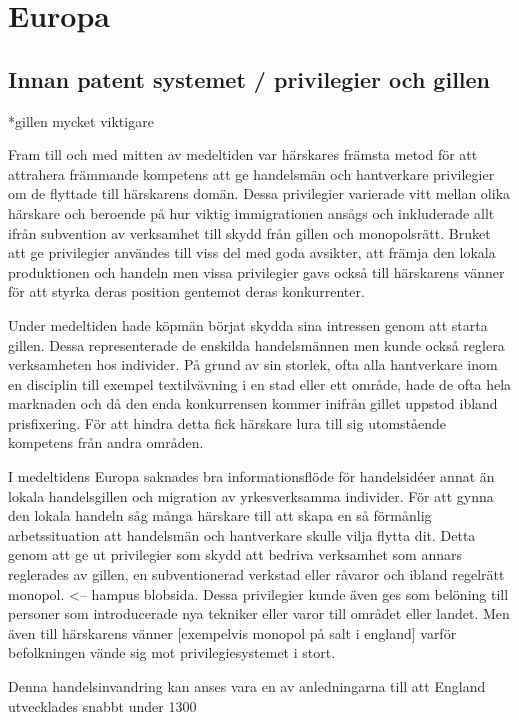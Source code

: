\section{Europa}

\subsection{Innan patent systemet / privilegier och gillen} %
\label{sub:innan_patent_systemet}
*gillen mycket viktigare

Fram till och med mitten av medeltiden var härskares främsta metod för att attrahera främmande kompetens att ge handelsmän och hantverkare privilegier om de flyttade till härskarens domän. 
Dessa privilegier varierade vitt mellan olika härskare och beroende på hur viktig immigrationen ansågs och inkluderade allt ifrån subvention av verksamhet till skydd från gillen och monopolsrätt. 
Bruket att ge privilegier användes till viss del med goda avsikter, att främja den lokala produktionen och handeln men vissa privilegier gavs också till härskarens vänner för att styrka deras position gentemot deras konkurrenter.


Under medeltiden hade köpmän börjat skydda sina intressen genom att starta gillen. 
Dessa representerade de enskilda handelsmännen men kunde också reglera verksamheten hos individer. 
På grund av sin storlek, ofta alla hantverkare inom en disciplin till exempel textilvävning i en stad eller ett område, hade de ofta hela marknaden och då den enda konkurrensen kommer inifrån gillet uppstod ibland prisfixering. 
För att hindra detta fick härskare lura till sig utomstående kompetens från andra områden.

I medeltidens Europa saknades bra informationsflöde för handelsidéer annat än lokala handelsgillen och migration av yrkesverksamma individer. 
För att gynna den lokala handeln såg många härskare till att skapa en så förmånlig arbetssituation att handelsmän och hantverkare skulle vilja flytta dit. 
Detta genom att ge ut privilegier som skydd att bedriva verksamhet som annars reglerades av gillen, en subventionerad verkstad eller råvaror och ibland regelrätt monopol. 
<-- hampus blobsida. 
Dessa privilegier kunde även ges som belöning till personer som introducerade nya tekniker eller varor till området eller landet. 
Men även till härskarens vänner [exempelvis monopol på salt i england] varför befolkningen vände sig mot privilegiesystemet i stort.


Denna handelsinvandring kan anses vara en av anledningarna till att England utvecklades snabbt under 1300

